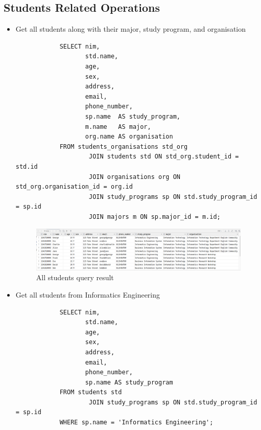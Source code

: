 \documentclass[12pt,titlepage]{article}
\begin{document}
\subsection{Students Related Operations}
\begin{itemize}
    \item {
        Get all students along with their major, study program, and organisation

        \begin{verbatim}
            SELECT nim,
                   std.name,
                   age,
                   sex,
                   address,
                   email,
                   phone_number,
                   sp.name  AS study_program,
                   m.name   AS major,
                   org.name AS organisation
            FROM students_organisations std_org
                    JOIN students std ON std_org.student_id = std.id
                    JOIN organisations org ON std_org.organisation_id = org.id
                    JOIN study_programs sp ON std.study_program_id = sp.id
                    JOIN majors m ON sp.major_id = m.id;
        \end{verbatim}

        \begin{figure}[h]
            \centering
            \includegraphics[width=\textwidth]{images/all-students-query.png}
            \caption{All students query result}
        \end{figure}
    }
    \pagebreak
    \item {
        Get all students from Informatics Engineering

        \begin{verbatim}
            SELECT nim,
                   std.name,
                   age,
                   sex,
                   address,
                   email,
                   phone_number,
                   sp.name AS study_program
            FROM students std
                    JOIN study_programs sp ON std.study_program_id = sp.id
            WHERE sp.name = 'Informatics Engineering';
        \end{verbatim}

}
\end{itemize}
\end{document}
